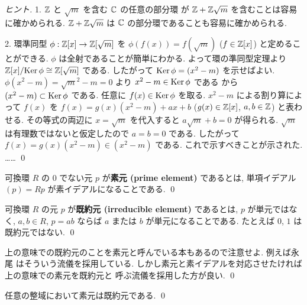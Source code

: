 \documentclass[12pt,twoside]{jarticle}
\begin{document}
\begin{proof}[ヒント]
 1. ${\mathbb Z}$ と $\sqrt{m}$ を含む ${\mathbb C}$ の任意の部分環
 が ${\mathbb Z}+{\mathbb Z}\sqrt{m}$ を含むことは容易に確かめられる.
 ${\mathbb Z}+{\mathbb Z}\sqrt{m}$ は ${\mathbb C}$ の部分環であることも容易に確かめられる.

 2. 環準同型 $\phi:{\mathbb Z}[x]\to{\mathbb Z}[\sqrt{m}]$ を $\phi(f(x))=f(\sqrt{m})$ 
 ($f\in{\mathbb Z}[x]$) と定めることができる. $\phi$ は全射であることが簡単にわかる. 
 よって環の準同型定理より ${\mathbb Z}[x]/\!\mathop{\mathrm{Ker}}\nolimits\phi\cong{\mathbb Z}[\sqrt{m}]$ である. 
 したがって $\mathop{\mathrm{Ker}}\nolimits\phi=(x^2-m)$ を示せばよい.
 $\phi(x^2-m)=\sqrt{m}^2-m=0$ より $x^2-m\in\mathop{\mathrm{Ker}}\nolimits\phi$ である
 から $(x^2-m)\subset\mathop{\mathrm{Ker}}\nolimits\phi$ である.
 任意に $f(x)\in\mathop{\mathrm{Ker}}\nolimits\phi$ を取る. 
 $x^2-m$ による割り算によって $f(x)$ を $f(x)=g(x)(x^2-m)+ax+b$ 
 ($g(x)\in{\mathbb Z}[x]$, $a,b\in{\mathbb Z}$) と表わせる. 
 その等式の両辺に $x=\sqrt{m}$ を代入すると
\ifx\STUDENT\undefined
 $a\sqrt{m}+b=0$ が得られる.
 $\sqrt{m}$ は有理数ではないと仮定したので $a=b=0$ である.
 したがって $f(x)=g(x)(x^2-m)\in(x^2-m)$ である.
 これで示すべきことが示された.
\else
 ……
\fi
 \qed
\end{proof}


\begin{definition}[素元]
 可換環 $R$ の $0$ でない元 $p$ が{\bf 素元 (prime element)} であるとは, %
 単項イデアル $(p)=Rp$ が素イデアルになることである.
 \qed
\end{definition}

\begin{definition}[既約元]
 可換環 $R$ の元 $p$ が{\bf 既約元 (irreducible element)} であるとは, %
 $p$ が単元ではなく, 
 $a,b\in R$, $p=ab$ ならば $a$ または $b$ が単元になることである.
 たとえば $0$, $1$ は既約元ではない.
 \qed
\end{definition}

\begin{rem}
 上の意味での既約元のことを素元と呼んでいる本もあるので注意せよ.
 例えば永尾 \cite{nagao-1983} はそういう流儀を採用している.
 しかし素元と素イデアルを対応させたければ上の意味での素元を既約元と
 呼ぶ流儀を採用した方が良い.
 \qed
\end{rem}

\begin{question}[任意の整域において素元は既約元, 簡単]
 \label{q:prime=>irred'}
 任意の整域において素元は既約元である. \qed
\end{question}
\end{document}
